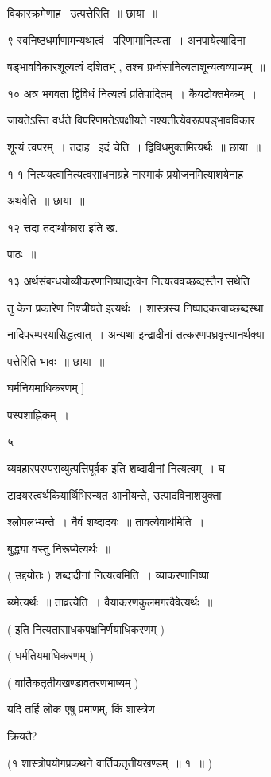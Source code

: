 \documentclass[11pt, openany]{book}
\begin{document}
विकारक्रमेणाह \textendash\ उत्पत्तेरिति~॥ छाया~॥ 

९ स्वनिष्ठधर्माणामन्यथात्वं \textendash\ परिणामानित्यता~। अनपायेत्यादिना 

षड्भावविकारशूत्यत्वं दशितभ् , तश्च प्रध्वंसानित्यताशून्यत्वव्याप्यम्~॥


१० अत्र भगवता द्विविधं नित्यत्वं प्रतिपादितम्~। कैयटोक्तमेकम्~। 

जायतेऽस्ति वर्धते विपरिणमतेऽपक्षीयते नश्यतीत्येवरूपपड्भावविकार \textendash\ 

शून्यं त्वपरम्~। तदाह \textendash\ इदं चेति~। द्विविधमुक्तमित्यर्थः~॥ छाया~॥ 

१ १ नित्ययत्वानित्यत्वसाधनाग्रहे नास्माकं प्रयोजनमित्याशयेनाह \textendash\ 

अथवेति~॥ छाया~॥ 

१२ {\qt त्तदा तदार्थाकारा} इति ख. 

पाठः~॥ 

१३ अर्थसंबन्धयोव्यीकरणानिष्पाद्यत्वेन नित्यत्ववच्छव्दस्तैन सथेति 

तु केन प्रकारेण निश्चीयते इत्यर्थः~। शास्त्रस्य निष्पादकत्वाच्छब्दस्था \textendash\ 


नादिपरम्परयासिद्धत्वात्~। अन्यथा इन्द्रादीनां
तत्करणपघ्रवृत्त्यानर्थक्या \textendash\ 

पत्तेरिति भावः~॥ छाया~॥ 



घर्मनियमाधिकरणम् ] 

पस्पशाह्निकम्~। 

५ 

व्यवहारपरम्पराव्युत्पत्तिपूर्वक इति शब्दादीनां नित्यत्वम्~। घ \textendash\ 

टादयस्त्वर्थकियार्थिभिरन्यत आनीयन्ते, उत्पादविनाशयुक्ता \textendash\ 

श्लोपलभ्यन्ते~। नैवं शब्दादयः~॥ तावत्येवार्थमिति~। 

बुद्ध्या वस्तु निरूप्येत्यर्थः~॥ 

( उद्दयोतः ) शब्दादीनां नित्यत्वमिति~। व्याकरणानिष्पा \textendash\ 

ब्य्मेत्यर्थः~॥ ताव्रत्येेति~। वैयाकरणकुलमगत्वैवेत्यर्थः~॥ 

( इति नित्यतासाधकपक्षनिर्णयाधिकरणम् ) 

( धर्मतियमाधिकरणम् ) 

( वार्तिकतृतीयखण्डावतरणभाष्यम् ) 

यदि तर्हि लोक एषु प्रमाणम्, किं शास्त्रेण 

क्रियतै? 

(१ शास्त्रोपयोगप्रकथने वार्तिकतृतीयखण्डम्~॥ १~॥ ) 
\end{document}
